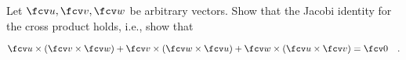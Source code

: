 Let $\fcv u, \fcv v, \fcv w$ be arbitrary vectors. Show that the Jacobi identity for the cross product holds, i.e., show that 

\[
\fcv u\times (\fcv v \times \fcv w)+\fcv v\times (\fcv w \times \fcv u)+\fcv w\times (\fcv u \times \fcv v)=\fcv 0\quad. 
\]